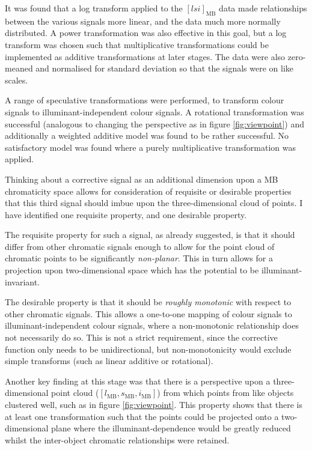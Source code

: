 It was found that a log transform applied to the $[lsi]_{\text{MB}}$ data made relationships between the various signals more linear, and the data much more normally distributed. A power transformation was also effective in this goal, but a log transform was chosen such that multiplicative transformations could be implemented as additive transformations at later stages. The data were also zero-meaned and normalised for standard deviation so that the signals were on like scales.

A range of speculative transformations were performed, to transform colour signals to illuminant-independent colour signals. A rotational transformation was successful (analogous to changing the perspective as in figure \ref{fig:viewpoint}) and additionally a weighted additive model was found to be rather successful. No satisfactory model was found where a purely multiplicative transformation was applied.

Thinking about a corrective signal as an additional dimension upon a \gls{MB} chromaticity space allows for consideration of requisite or desirable properties that this third signal should imbue upon the three-dimensional cloud of points. I have identified one requisite property, and one desirable property. 

The requisite property for such a signal, as already suggested, is that it should differ from other chromatic signals enough to allow for the point cloud of chromatic points to be significantly \emph{non-planar}. This in turn allows for a projection upon two-dimensional space which has the potential to be illuminant-invariant.

The desirable property is that it should be \emph{roughly monotonic} with respect to other chromatic signals. This allows a one-to-one mapping of colour signals to illuminant-independent colour signals, where a non-monotonic relationship does not necessarily do so. This is not a strict requirement, since the corrective function only needs to be unidirectional, but non-monotonicity would exclude simple transforms (such as linear additive or rotational).

Another key finding at this stage was that there is a perspective upon a three-dimensional point cloud ($[l_{\text{MB}},s_{\text{MB}},i_{\text{MB}}]$) from which points from like objects clustered well, such as in figure \ref{fig:viewpoint}. This property shows that there is at least one transformation such that the points could be projected onto a two-dimensional plane where the illuminant-dependence would be greatly reduced whilst the inter-object chromatic relationships were retained. 

